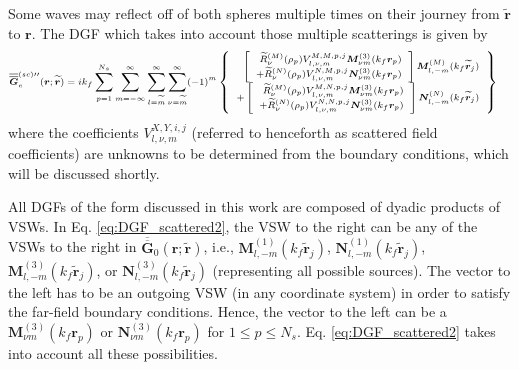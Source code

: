 Some waves may reflect off of both spheres multiple times on their journey from $\boldsymbol{\widetilde{r}}$ to $\boldsymbol{r}$. The DGF which takes into account those multiple scatterings is given by
%
\begin{equation}\label{eq:DGF_scattered2} \scriptsize
\begin{split}
\overline{\overline{\boldsymbol{G}}}_{e}^{(sc)\prime\prime}(\boldsymbol{r}; \widetilde{\boldsymbol{r}})
&= ik_{f} \sum\limits_{p=1}^{N_{s}} \sum\limits_{m=-\infty}^{\infty} \sum\limits_{l=\widetilde{m}}^{\infty} \sum_{\nu = \widetilde{m}}^{\infty} (-1)^{m}
\left\{ \begin{array}{r} \left[ \begin{array}{r}
\widetilde{R}_{\nu}^{(M)}(\rho_{p}) V_{l, \nu,m}^{M,M,p,j} \boldsymbol{M}_{\nu m}^{(3)}(k_{f} \boldsymbol{r}_{p})
\\
+ \widetilde{R}_{\nu}^{(N)}(\rho_{p}) V_{l, \nu,m}^{N,M,p,j} \boldsymbol{N}_{\nu m}^{(3)}(k_{f} \boldsymbol{r}_{p})
\end{array} \right] \boldsymbol{M}_{l, -m}^{(M)}(k_{f} \widetilde{\boldsymbol{r}}_{j})
\\
+ \left[ \begin{array}{r}
\widetilde{R}_{\nu}^{(M)}(\rho_{p}) V_{l, \nu,m}^{M,N,p,j} \boldsymbol{M}_{\nu m}^{(3)}(k_{f} \boldsymbol{r}_{p})
\\
+ \widetilde{R}_{\nu}^{(N)}(\rho_{p}) V_{l, \nu,m}^{N,N,p,j} \boldsymbol{N}_{\nu m}^{(3)}(k_{f} \boldsymbol{r}_{p})
\end{array} \right] \boldsymbol{N}_{l, -m}^{(N)}(k_{f} \widetilde{\boldsymbol{r}}_{j})
\end{array} \right\}
\end{split}
\end{equation}
%
where the coefficients $V_{l, \nu, m}^{X,Y,i,j}$ (referred to henceforth as scattered field coefficients) are unknowns to be determined from the boundary conditions, which will be discussed shortly.

All DGFs of the form discussed in this work are composed of dyadic products\cite{Lai2009} of VSWs. In Eq. \ref{eq:DGF_scattered2}, the VSW to the right can be any of the VSWs to the right in $\overline{\overline{\boldsymbol{G}}}_{0}(\boldsymbol{r}; \boldsymbol{\widetilde{r}})$, i.e., $\boldsymbol{M}_{l, -m}^{(1)}(k_{f} \widetilde{\boldsymbol{r}}_{j})$, $\boldsymbol{N}_{l, -m}^{(1)}(k_{f} \widetilde{\boldsymbol{r}}_{j})$, $\boldsymbol{M}_{l, -m}^{(3)}(k_{f} \widetilde{\boldsymbol{r}}_{j})$, or $\boldsymbol{N}_{l, -m}^{(3)}(k_{f} \widetilde{\boldsymbol{r}}_{j})$ (representing all possible sources). The vector to the left has to be an outgoing VSW (in any coordinate system) in order to satisfy the far-field boundary conditions. Hence, the vector to the left can be a $\boldsymbol{M}_{\nu m}^{(3)}(k_{f} \boldsymbol{r}_{p})$ or $\boldsymbol{N}_{\nu m}^{(3)}(k_{f} \boldsymbol{r}_{p})$ for $1 \le p \le N_{s}$. Eq. \ref{eq:DGF_scattered2} takes into account all these possibilities.


